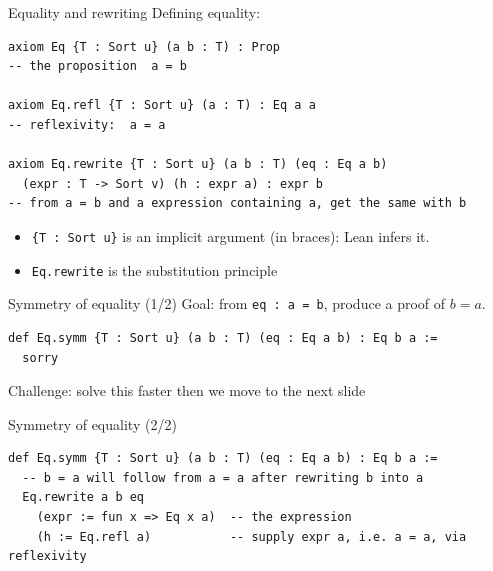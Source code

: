 \documentclass[aspectratio=169]{beamer}
\begin{document}
\begin{frame}[fragile]{Equality and rewriting}
Defining equality:
\begin{lstlisting}
axiom Eq {T : Sort u} (a b : T) : Prop
-- the proposition  a = b

axiom Eq.refl {T : Sort u} (a : T) : Eq a a
-- reflexivity:  a = a

axiom Eq.rewrite {T : Sort u} (a b : T) (eq : Eq a b)
  (expr : T -> Sort v) (h : expr a) : expr b
-- from a = b and a expression containing a, get the same with b
\end{lstlisting}
  \begin{itemize}
    \item \texttt{\{T : Sort u\}} is an \alert{implicit} argument (in braces):
          Lean infers it.
    \item \texttt{Eq.rewrite} is the \alert{substitution principle}
  \end{itemize}
\end{frame}

\begin{frame}[fragile]{Symmetry of equality \hfill (1/2)}
  Goal: from \texttt{eq : a = b}, produce a proof of $b = a$.
\begin{lstlisting}
def Eq.symm {T : Sort u} (a b : T) (eq : Eq a b) : Eq b a :=
  sorry
\end{lstlisting}
Challenge: solve this faster then we move to the next slide

\end{frame}

\begin{frame}[fragile]{Symmetry of equality \hfill (2/2)}
\begin{lstlisting}
def Eq.symm {T : Sort u} (a b : T) (eq : Eq a b) : Eq b a :=
  -- b = a will follow from a = a after rewriting b into a
  Eq.rewrite a b eq            
    (expr := fun x => Eq x a)  -- the expression 
    (h := Eq.refl a)           -- supply expr a, i.e. a = a, via reflexivity
\end{lstlisting}

\end{frame}
\end{document}
